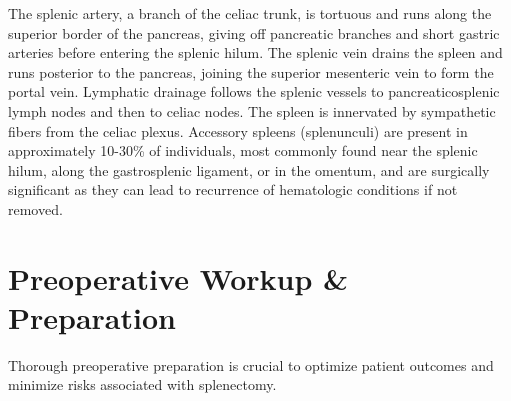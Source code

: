 The splenic artery, a branch of the celiac trunk, is tortuous and runs along the superior border of the pancreas, giving off pancreatic branches and short gastric arteries before entering the splenic hilum. The splenic vein drains the spleen and runs posterior to the pancreas, joining the superior mesenteric vein to form the portal vein. Lymphatic drainage follows the splenic vessels to pancreaticosplenic lymph nodes and then to celiac nodes. The spleen is innervated by sympathetic fibers from the celiac plexus. Accessory spleens (splenunculi) are present in approximately 10-30\% of individuals, most commonly found near the splenic hilum, along the gastrosplenic ligament, or in the omentum, and are surgically significant as they can lead to recurrence of hematologic conditions if not removed.

\section*{Preoperative Workup \& Preparation}
Thorough preoperative preparation is crucial to optimize patient outcomes and minimize risks associated with splenectomy.

